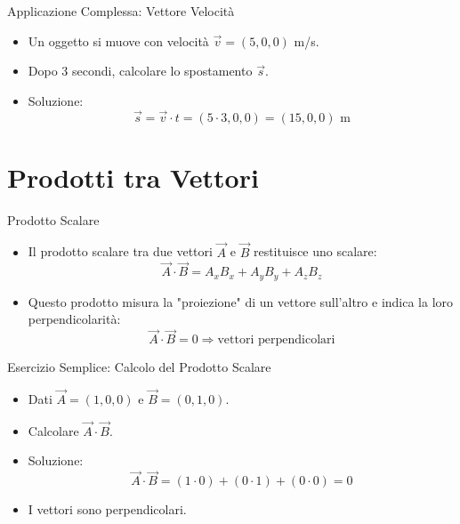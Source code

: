 \documentclass{beamer}
\begin{document}
\begin{frame}{Applicazione Complessa: Vettore Velocità}
    \begin{itemize}
        \item Un oggetto si muove con velocità \( \vec{v} = (5, 0, 0) \) m/s.
        \item Dopo 3 secondi, calcolare lo spostamento \( \vec{s} \).
        \item Soluzione:
        \[
        \vec{s} = \vec{v} \cdot t = (5 \cdot 3, 0, 0) = (15, 0, 0) \text{ m}
        \]
    \end{itemize}
\end{frame}

\section{Prodotti tra Vettori}

\begin{frame}{Prodotto Scalare}
    \begin{itemize}
        \item Il prodotto scalare tra due vettori \( \vec{A} \) e \( \vec{B} \) restituisce uno scalare:
        \[
        \vec{A} \cdot \vec{B} = A_x B_x + A_y B_y + A_z B_z
        \]
        \item Questo prodotto misura la "proiezione" di un vettore sull'altro e indica la loro perpendicolarità:
        \[
        \vec{A} \cdot \vec{B} = 0 \Rightarrow \text{vettori perpendicolari}
        \]
    \end{itemize}
\end{frame}

\begin{frame}{Esercizio Semplice: Calcolo del Prodotto Scalare}
    \begin{itemize}
        \item Dati \( \vec{A} = (1, 0, 0) \) e \( \vec{B} = (0, 1, 0) \).
        \item Calcolare \( \vec{A} \cdot \vec{B} \).
        \item Soluzione:
        \[
        \vec{A} \cdot \vec{B} = (1 \cdot 0) + (0 \cdot 1) + (0 \cdot 0) = 0
        \]
        \item I vettori sono perpendicolari.
    \end{itemize}
\end{frame}
\end{document}
